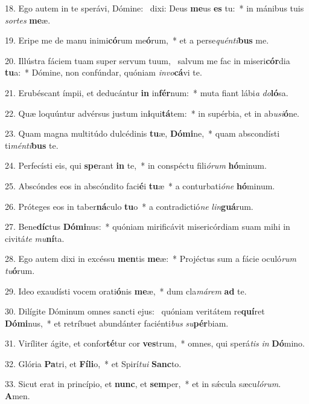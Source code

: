 18. Ego autem in te sperávi, Dómine: \dag\  dixi: Deus \textbf{me}us \textbf{es} tu:~*  in mánibus tuis \textit{sor}\textit{tes} \textbf{me}æ.\

19. Eripe me de manu inimi\textbf{có}rum me\textbf{ó}rum,~*  et a perse\textit{quén}\textit{ti}\textbf{bus} me.\

20. Illústra fáciem tuam super servum tuum, \dag\  salvum me fac in miseri\textbf{cór}dia \textbf{tu}a:~*  Dómine, non confúndar, quóniam \textit{in}\textit{vo}\textbf{cá}vi te.\

21. Erubéscant ímpii, et deducántur \textbf{in} in\textbf{fér}num:~*  muta fiant lábi\textit{a} \textit{do}\textbf{ló}sa.\

22. Quæ loquúntur advérsus justum in\textbf{i}qui\textbf{tá}tem:~*  in supérbia, et in ab\textit{u}\textit{si}\textbf{ó}ne.\

23. Quam magna multitúdo dulcédinis \textbf{tu}æ, \textbf{Dó}\textbf{mi}ne,~*  quam abscondísti ti\textit{mén}\textit{ti}\textbf{bus} te.\

24. Perfecísti eis, qui \textbf{spe}rant \textbf{in} te,~*  in conspéctu fili\textit{ó}\textit{rum} \textbf{hó}minum.\

25. Abscóndes eos in abscóndito faci\textbf{é}i \textbf{tu}æ~*  a conturbati\textit{ó}\textit{ne} \textbf{hó}minum.\

26. Próteges eos in taber\textbf{ná}culo \textbf{tu}o~*  a contradictió\textit{ne} \textit{lin}\textbf{guá}rum.\

27. Bene\textbf{díc}tus \textbf{Dó}\textbf{mi}nus:~*  quóniam mirificávit misericórdiam suam mihi in civitá\textit{te} \textit{mu}\textbf{ní}ta.\

28. Ego autem dixi in excéssu \textbf{men}tis \textbf{me}æ:~*  Projéctus sum a fácie oculó\textit{rum} \textit{tu}\textbf{ó}rum.\

29. Ideo exaudísti vocem orati\textbf{ó}nis \textbf{me}æ,~*  dum cla\textit{má}\textit{rem} \textbf{ad} te.\

30. Dilígite Dóminum omnes sancti ejus: \dag\  quóniam veritátem re\textbf{quí}ret \textbf{Dó}\textbf{mi}nus,~*  et retríbuet abundánter faciénti\textit{bus} \textit{su}\textbf{pér}biam.\

31. Viríliter ágite, et confor\textbf{té}tur cor \textbf{ves}trum,~*  omnes, qui sperá\textit{tis} \textit{in} \textbf{Dó}mino.\

32. Glória \textbf{Pa}tri, et \textbf{Fí}\textbf{li}o,~*  et Spirí\textit{tu}\textit{i} \textbf{Sanc}to.\

33. Sicut erat in princípio, et \textbf{nunc}, et \textbf{sem}per,~*  et in sǽcula sæcu\textit{ló}\textit{rum}. \textbf{A}men.\

